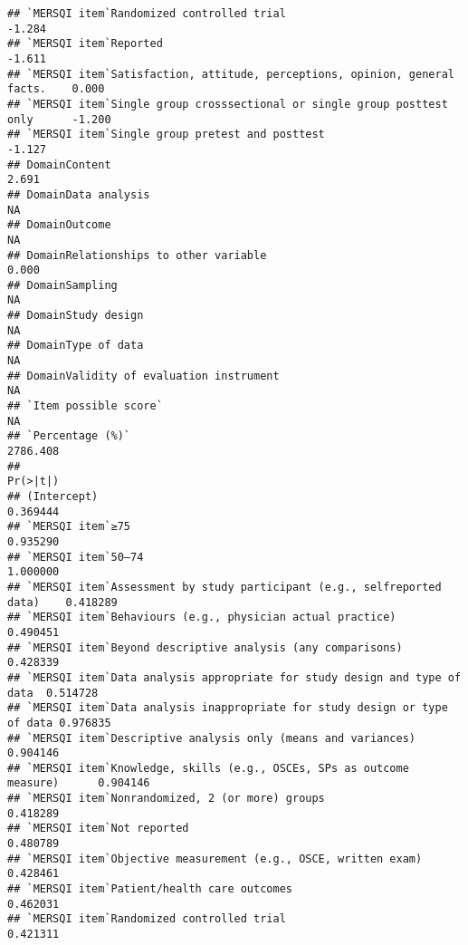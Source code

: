 \documentclass[]{article}
\begin{document}
\begin{verbatim}
## `MERSQI item`Randomized controlled trial                                    -1.284
## `MERSQI item`Reported                                                       -1.611
## `MERSQI item`Satisfaction, attitude, perceptions, opinion, general facts.    0.000
## `MERSQI item`Single group crosssectional or single group posttest only      -1.200
## `MERSQI item`Single group pretest and posttest                              -1.127
## DomainContent                                                                2.691
## DomainData analysis                                                             NA
## DomainOutcome                                                                   NA
## DomainRelationships to other variable                                        0.000
## DomainSampling                                                                  NA
## DomainStudy design                                                              NA
## DomainType of data                                                              NA
## DomainValidity of evaluation instrument                                         NA
## `Item possible score`                                                           NA
## `Percentage (%)`                                                          2786.408
##                                                                           Pr(>|t|)
## (Intercept)                                                               0.369444
## `MERSQI item`≥75                                                          0.935290
## `MERSQI item`50–74                                                        1.000000
## `MERSQI item`Assessment by study participant (e.g., selfreported data)    0.418289
## `MERSQI item`Behaviours (e.g., physician actual practice)                 0.490451
## `MERSQI item`Beyond descriptive analysis (any comparisons)                0.428339
## `MERSQI item`Data analysis appropriate for study design and type of data  0.514728
## `MERSQI item`Data analysis inappropriate for study design or type of data 0.976835
## `MERSQI item`Descriptive analysis only (means and variances)              0.904146
## `MERSQI item`Knowledge, skills (e.g., OSCEs, SPs as outcome measure)      0.904146
## `MERSQI item`Nonrandomized, 2 (or more) groups                            0.418289
## `MERSQI item`Not reported                                                 0.480789
## `MERSQI item`Objective measurement (e.g., OSCE, written exam)             0.428461
## `MERSQI item`Patient/health care outcomes                                 0.462031
## `MERSQI item`Randomized controlled trial                                  0.421311

\end{verbatim}
\end{document}
